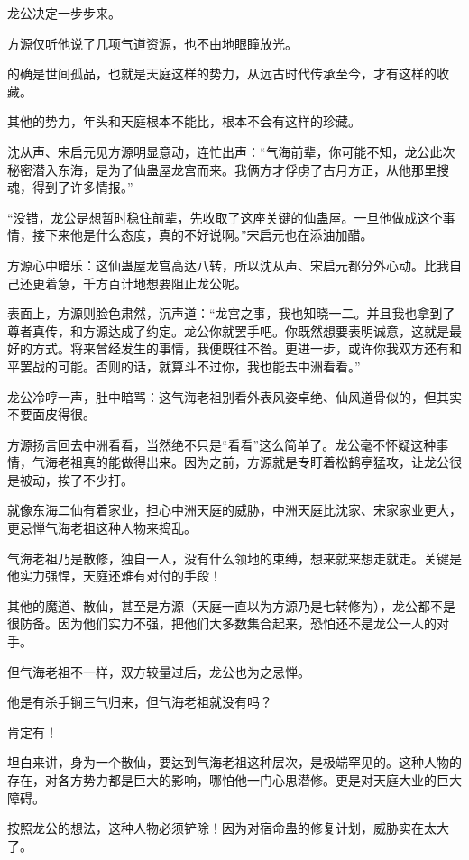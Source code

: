 \begin{this_body}
龙公决定一步步来。

方源仅听他说了几项气道资源，也不由地眼瞳放光。

的确是世间孤品，也就是天庭这样的势力，从远古时代传承至今，才有这样的收藏。

其他的势力，年头和天庭根本不能比，根本不会有这样的珍藏。

沈从声、宋启元见方源明显意动，连忙出声：“气海前辈，你可能不知，龙公此次秘密潜入东海，是为了仙蛊屋龙宫而来。我俩方才俘虏了古月方正，从他那里搜魂，得到了许多情报。”

“没错，龙公是想暂时稳住前辈，先收取了这座关键的仙蛊屋。一旦他做成这个事情，接下来他是什么态度，真的不好说啊。”宋启元也在添油加醋。

方源心中暗乐：这仙蛊屋龙宫高达八转，所以沈从声、宋启元都分外心动。比我自己还更着急，千方百计地想要阻止龙公呢。

表面上，方源则脸色肃然，沉声道：“龙宫之事，我也知晓一二。并且我也拿到了尊者真传，和方源达成了约定。龙公你就罢手吧。你既然想要表明诚意，这就是最好的方式。将来曾经发生的事情，我便既往不咎。更进一步，或许你我双方还有和平罢战的可能。否则的话，就算斗不过你，我也能去中洲看看。”

龙公冷哼一声，肚中暗骂：这气海老祖别看外表风姿卓绝、仙风道骨似的，但其实不要面皮得很。

方源扬言回去中洲看看，当然绝不只是“看看”这么简单了。龙公毫不怀疑这种事情，气海老祖真的能做得出来。因为之前，方源就是专盯着松鹤亭猛攻，让龙公很是被动，挨了不少打。

就像东海二仙有着家业，担心中洲天庭的威胁，中洲天庭比沈家、宋家家业更大，更忌惮气海老祖这种人物来捣乱。

气海老祖乃是散修，独自一人，没有什么领地的束缚，想来就来想走就走。关键是他实力强悍，天庭还难有对付的手段！

其他的魔道、散仙，甚至是方源（天庭一直以为方源乃是七转修为），龙公都不是很防备。因为他们实力不强，把他们大多数集合起来，恐怕还不是龙公一人的对手。

但气海老祖不一样，双方较量过后，龙公也为之忌惮。

他是有杀手锏三气归来，但气海老祖就没有吗？

肯定有！

坦白来讲，身为一个散仙，要达到气海老祖这种层次，是极端罕见的。这种人物的存在，对各方势力都是巨大的影响，哪怕他一门心思潜修。更是对天庭大业的巨大障碍。

按照龙公的想法，这种人物必须铲除！因为对宿命蛊的修复计划，威胁实在太大了。


\end{this_body}
